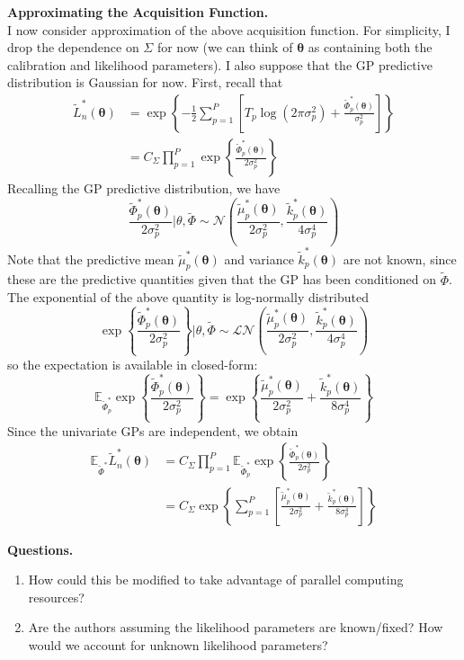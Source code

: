\documentclass[12pt]{article}
\newcommand{\E}{\mathbb{E}}
\newcommand{\btheta}{\boldsymbol{\theta}}
\begin{document}
\bigskip
\noindent
\textbf{Approximating the Acquisition Function.} \\
I now consider approximation of the above acquisition function. For simplicity, I drop the dependence on $\Sigma$ for now (we can think of $\btheta$ as containing both the 
calibration and likelihood parameters). I also suppose that the GP predictive distribution is Gaussian for now. First, recall that 
\begin{align*}
\tilde{L}_n^*(\btheta) &= \exp\left\{ -\frac{1}{2} \sum_{p = 1}^{P} \left[T_p \log\left(2\pi \sigma_p^2\right) + \frac{\tilde{\Phi}^*_p(\btheta)}{\sigma_p^2}\right] \right\} \\
				&= C_{\Sigma} \prod_{p = 1}^{P} \exp\left\{\frac{\tilde{\Phi}^*_p(\btheta)}{2\sigma_p^2}\right\}
\end{align*}
Recalling the GP predictive distribution, we have 
\[\frac{\tilde{\Phi}^*_p(\btheta)}{2\sigma_p^2}\bigg|\theta, \tilde{\Phi} \sim \mathcal{N}\left(\frac{\tilde{\mu}_p^*(\btheta)}{2\sigma_p^2}, \frac{\tilde{k}_p^*(\btheta)}{4\sigma_p^4} \right) \]
Note that the predictive mean $\tilde{\mu}_p^*(\btheta)$ and variance $\tilde{k}_p^*(\btheta)$ are not known, since these are the predictive quantities given that the GP has been 
conditioned on $\tilde{\Phi}$. 
The exponential of the above quantity is log-normally distributed
\[\exp\left\{\frac{\tilde{\Phi}^*_p(\btheta)}{2\sigma_p^2}\right\}\bigg|\theta, \tilde{\Phi} \sim \mathcal{LN}\left(\frac{\tilde{\mu}_p^*(\btheta)}{2\sigma_p^2}, \frac{\tilde{k}_p^*(\btheta)}{4\sigma_p^4} \right) \]
so the expectation is available in closed-form:
\[\E_{\tilde{\Phi}_p^*} \exp\left\{\frac{\tilde{\Phi}^*_p(\btheta)}{2\sigma_p^2}\right\} = \exp\left\{\frac{\tilde{\mu}_p^*(\btheta)}{2\sigma_p^2} + \frac{\tilde{k}_p^*(\btheta)}{8\sigma_p^4} \right\} \]
Since the univariate GPs are independent, we obtain 
\begin{align*}
\E_{\tilde{\Phi}^*} \tilde{L}_n^*(\btheta) &= C_\Sigma \prod_{p = 1}^{P} \E_{\tilde{\Phi}_p^*} \exp\left\{\frac{\tilde{\Phi}^*_p(\btheta)}{2\sigma_p^2}\right\} \\
							   &= C_\Sigma \exp\left\{\sum_{p = 1}^{P} \left[ \frac{\tilde{\mu}_p^*(\btheta)}{2\sigma_p^2} + \frac{\tilde{k}_p^*(\btheta)}{8\sigma_p^4} \right] \right\}
\end{align*}

\bigskip
\noindent
\textbf{Questions.}
\begin{enumerate}
\item How could this be modified to take advantage of parallel computing resources? 
\item Are the authors assuming the likelihood parameters are known/fixed? How would we account for unknown likelihood parameters? 
\end{enumerate}
\end{document}
